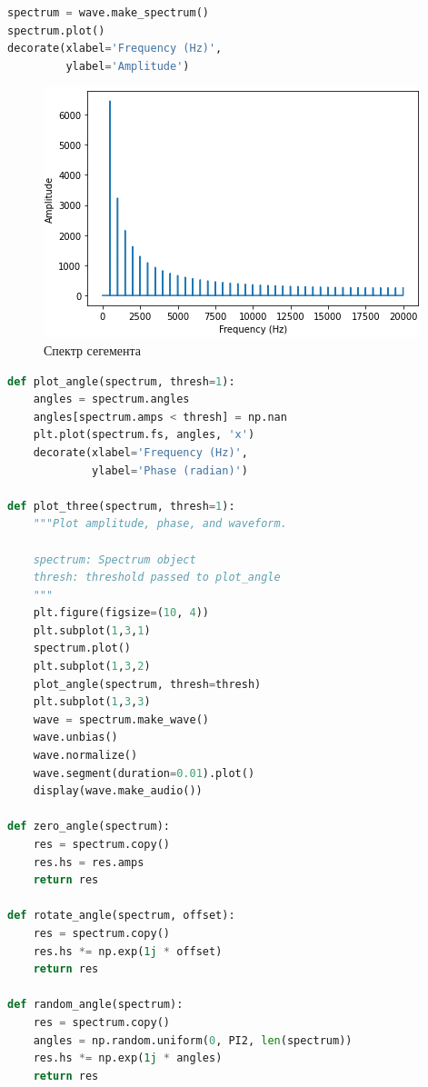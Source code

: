 \begin{lstlisting}[language=Python]
spectrum = wave.make_spectrum()
spectrum.plot()
decorate(xlabel='Frequency (Hz)',
         ylabel='Amplitude')
\end{lstlisting}
\begin{figure}[H]
	\begin{center}
		\includegraphics[scale=1]{fig/lab06/lab6_5.png}
		\caption{Спектр сегемента}
	\end{center}
\end{figure}

\begin{lstlisting}[language=Python]
def plot_angle(spectrum, thresh=1):
    angles = spectrum.angles
    angles[spectrum.amps < thresh] = np.nan
    plt.plot(spectrum.fs, angles, 'x')
    decorate(xlabel='Frequency (Hz)', 
             ylabel='Phase (radian)')
             
def plot_three(spectrum, thresh=1):
    """Plot amplitude, phase, and waveform.
    
    spectrum: Spectrum object
    thresh: threshold passed to plot_angle
    """
    plt.figure(figsize=(10, 4))
    plt.subplot(1,3,1)
    spectrum.plot()
    plt.subplot(1,3,2)
    plot_angle(spectrum, thresh=thresh)
    plt.subplot(1,3,3)
    wave = spectrum.make_wave()
    wave.unbias()
    wave.normalize()
    wave.segment(duration=0.01).plot()
    display(wave.make_audio())

def zero_angle(spectrum):
    res = spectrum.copy()
    res.hs = res.amps
    return res
    
def rotate_angle(spectrum, offset):
    res = spectrum.copy()
    res.hs *= np.exp(1j * offset)
    return res

def random_angle(spectrum):
    res = spectrum.copy()
    angles = np.random.uniform(0, PI2, len(spectrum))
    res.hs *= np.exp(1j * angles)
    return res
\end{lstlisting}

